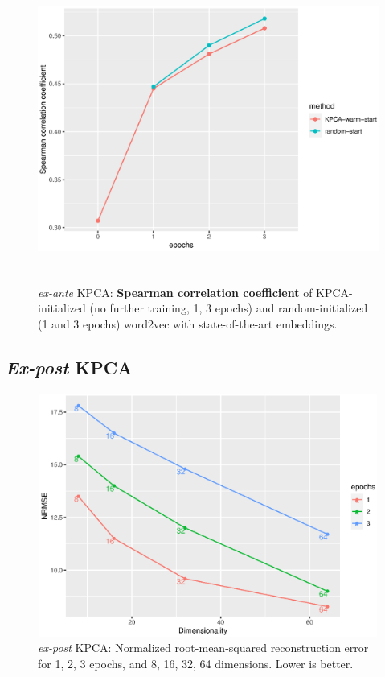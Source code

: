 \begin{figure}[H]  
\centering
\includegraphics[width=14cm,height=10cm]{./Figures/spear_ante.eps}
\caption{\textit{ex-ante} KPCA: \textbf{Spearman correlation coefficient} of KPCA-initialized (no further training, 1, 3 epochs) and random-initialized (1 and 3 epochs) word2vec with state-of-the-art embeddings.} 
\label{fig:spear_ante}
\end{figure}





\subsection{\textit{Ex-post} KPCA}

\begin{figure}[H]  
\centering
\includegraphics[width=12cm,height=8cm]{./Figures/scree_post.eps}
\caption{ \textit{ex-post} KPCA: Normalized root-mean-squared reconstruction error for 1, 2, 3 epochs, and 8, 16, 32, 64 dimensions. Lower is better.} 
\label{fig:scree_post}
\end{figure}

